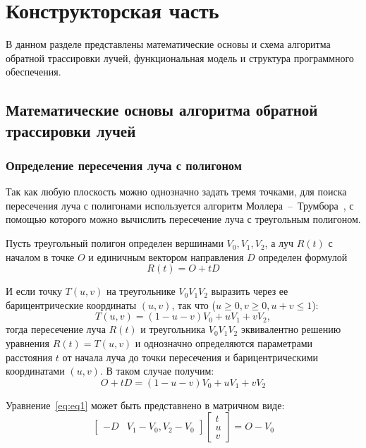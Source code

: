 \chapter{Конструкторская часть}

В данном разделе представлены математические основы и схема алгоритма обратной трассировки лучей, функциональная модель и структура программного обеспечения. 


\section{Математические основы алгоритма обратной трассировки лучей}
\subsection{Определение пересечения луча с полигоном}
Так как любую плоскость можно однозначно задать тремя точками, для поиска пересечения луча с полигонами используется алгоритм Моллера~--~Трумбора~\cite{trIntersect}, с помощью которого можно вычислить пересечение луча с треугольным полигоном.

Пусть треугольный полигон определен вершинами $V_0, V_1, V_2$, а луч $R(t)$ с началом в точке $O$ и единичным  вектором направления $D$ определен формулой
\begin{equation}
	R(t) = O + tD
\end{equation}

И если точку $T(u,v)$ на треугольнике $V_0V_1V_2$ выразить через ее барицентрические координаты $(u,v)$, так что ($u \geq 0, v \geq 0, u + v \leq 1$):
\begin{equation}
	T(u,v) = (1 - u - v)V_0 + uV_1 + vV_2,
\end{equation}
тогда пересечение луча $R(t)$ и треугольника $V_0V_1V_2$ эквивалентно решению уравнения
$R(t) = T(u, v)$ и однозначно определяются параметрами расстояния $t$ от начала луча до точки пересечения и барицентрическими координатами $(u,v)$. В таком случае получим:
\begin{equation}\label{eq:eq1}
	O + tD = (1- u - v)V_0 + uV_1 + vV_2
\end{equation}

Уравнение~\ref{eq:eq1} может быть представнено в матричном виде:
\begin{equation}
	\label{slau}
	\begin{bmatrix}
		-D & V_1 - V_0, V_2 - V_0
	\end{bmatrix}
	\begin{bmatrix}
		t\\
		u\\
		v
	\end{bmatrix} = O - V_0 
\end{equation}

